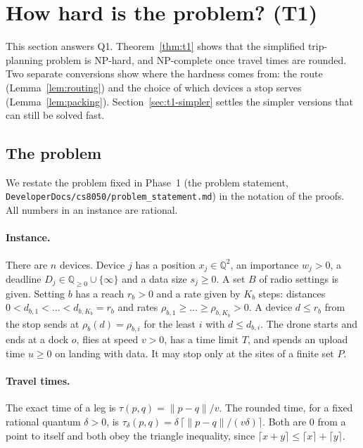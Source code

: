 
\section{How hard is the problem? (T1)}
\label{sec:t1}

This section answers Q1. Theorem~\ref{thm:t1} shows that the simplified
trip-planning problem is NP-hard, and NP-complete once travel times are
rounded. Two separate conversions show where the hardness comes from: the
route (Lemma~\ref{lem:routing}) and the choice of which devices a stop
serves (Lemma~\ref{lem:packing}). Section~\ref{sec:t1-simpler} settles the
simpler versions that can still be solved fast.

\subsection{The problem}
\label{sec:t1-problem}

We restate the problem fixed in Phase~1 (the problem statement,
\texttt{DeveloperDocs/cs8050/problem\_statement.md}) in the notation of the
proofs. All numbers in an instance are rational.

\paragraph{Instance.} There are $n$ devices. Device $j$ has a position
$x_j\in\mathbb{Q}^2$, an importance $w_j>0$, a deadline
$D_j\in\mathbb{Q}_{\ge 0}\cup\{\infty\}$ and a data size $s_j\ge 0$. A set
$B$ of radio settings is given. Setting $b$ has a reach $r_b>0$ and a rate
given by $K_b$ steps: distances $0<d_{b,1}<\dots<d_{b,K_b}=r_b$ and rates
$\rho_{b,1}\ge\dots\ge\rho_{b,K_b}>0$. A device $d\le r_b$ from the stop
sends at $\rho_b(d)=\rho_{b,i}$ for the least $i$ with $d\le d_{b,i}$. The
drone starts and ends at a dock $o$, flies at speed $v>0$, has a time limit
$T$, and spends an upload time $u\ge 0$ on landing with data. It may stop
only at the sites of a finite set $P$.

\paragraph{Travel times.} The exact time of a leg is
$\tau(p,q)=\lVert p-q\rVert/v$. The rounded time, for a fixed rational
quantum $\delta>0$, is
$\tau_\delta(p,q)=\delta\,\lceil \lVert p-q\rVert/(v\delta)\rceil$. Both are
$0$ from a point to itself and both obey the triangle inequality, since
$\lceil x+y\rceil\le\lceil x\rceil+\lceil y\rceil$.

